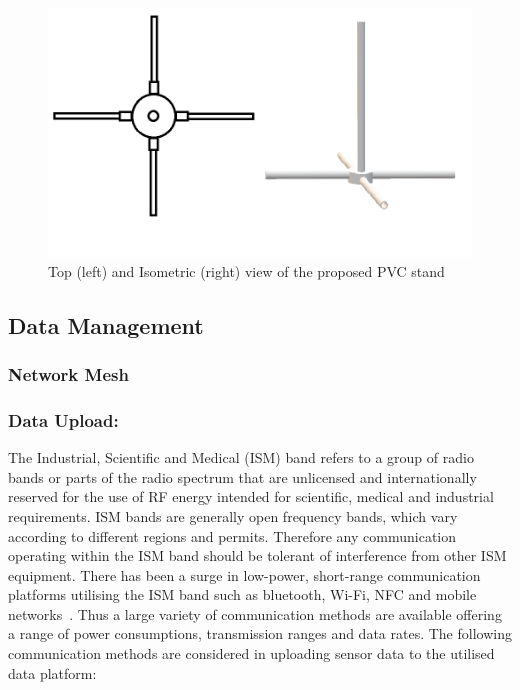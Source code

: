 \documentclass[10pt,twocolumn]{witseiepaper}
\begin{document}
		\begin{figure}
			\centering
			\includegraphics[width=1\columnwidth]{media/topIsoStand.png}
			\caption{Top (left) and Isometric (right) view of the proposed PVC stand}
			\raggedright
			\label{fig:stand}
		\end{figure}
	
	\subsection{Data Management}
		\subsubsection{Network Mesh}
		\subsubsection{Data Upload:}
			The Industrial, Scientific and Medical (ISM) band refers to a group of radio bands or parts of the radio spectrum that are unlicensed and internationally reserved for the use of RF energy intended for scientific, medical and industrial requirements. ISM bands are generally open frequency bands, which vary according to different regions and permits. Therefore any communication operating within the ISM band should be tolerant of interference from other ISM equipment. There has been a surge in low-power, short-range communication platforms utilising the ISM band such as bluetooth, Wi-Fi, NFC and mobile networks~\cite{ism}. Thus a large variety of communication methods are available offering a range of power consumptions, transmission ranges and data rates. The following communication methods are considered in uploading sensor data to the utilised data platform:
			
\end{document}
